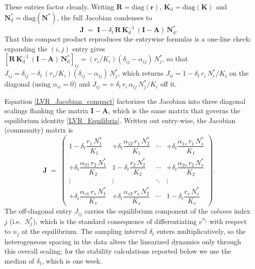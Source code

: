 \documentclass[12pt]{article}
\begin{document}
These entries factor cleanly. Writing $\mathbf{R}=\mathrm{diag}(\mathbf{r})$, $\mathbf{K}_{\mathrm{d}}=\mathrm{diag}(\mathbf{K})$ and $\mathbf{N}^{*}_{\mathrm{d}}=\mathrm{diag}(\mathbf{N}^{*})$, the full Jacobian condenses to
\begin{equation}\label{LVR_Jacobian_compact}
	\mathbf{J} \;=\; \mathbf{I} - \delta_{t}\,\mathbf{R}\,\mathbf{K}_{\mathrm{d}}^{-1}\,(\mathbf{I}-\mathbf{A})\,\mathbf{N}^{*}_{\mathrm{d}}.
\end{equation}
That this compact product reproduces the entrywise formulas is a one-line check: expanding the $(i,j)$ entry gives $[\mathbf{R}\,\mathbf{K}_{\mathrm{d}}^{-1}\,(\mathbf{I}-\mathbf{A})\,\mathbf{N}^{*}_{\mathrm{d}}]_{ij}=(r_{i}/K_{i})(\delta_{ij}-\alpha_{ij})\,N_{j}^{*}$, so that $J_{ij}=\delta_{ij}-\delta_{t}\,(r_{i}/K_{i})(\delta_{ij}-\alpha_{ij})\,N_{j}^{*}$, which returns $J_{ii}=1-\delta_{t}\,r_{i}\,N_{i}^{*}/K_{i}$ on the diagonal (using $\alpha_{ii}=0$) and $J_{ij}=+\,\delta_{t}\,r_{i}\,\alpha_{ij}\,N_{j}^{*}/K_{i}$ off it.

Equation \eqref{LVR_Jacobian_compact} factorizes the Jacobian into three diagonal scalings flanking the matrix $\mathbf{I}-\mathbf{A}$, which is the same matrix that governs the equilibrium identity \eqref{LVR_Equilibria}. Written out entry-wise, the Jacobian (community) matrix is
\begin{equation}\label{LVR_Jacobian}
	\mathbf{J} \;=\; \begin{pmatrix}
		1-\delta_{t}\dfrac{r_{1}\,N_{1}^{*}}{K_{1}} & +\delta_{t}\dfrac{\alpha_{12}\,r_{1}\,N_{2}^{*}}{K_{1}} & \cdots & +\delta_{t}\dfrac{\alpha_{1s}\,r_{1}\,N_{s}^{*}}{K_{1}} \\[6pt]
		+\delta_{t}\dfrac{\alpha_{21}\,r_{2}\,N_{1}^{*}}{K_{2}} & 1-\delta_{t}\dfrac{r_{2}\,N_{2}^{*}}{K_{2}} & \cdots & +\delta_{t}\dfrac{\alpha_{2s}\,r_{2}\,N_{s}^{*}}{K_{2}} \\[2pt]
		\vdots & \vdots & \ddots & \vdots \\[2pt]
		+\delta_{t}\dfrac{\alpha_{s1}\,r_{s}\,N_{1}^{*}}{K_{s}} & +\delta_{t}\dfrac{\alpha_{s2}\,r_{s}\,N_{2}^{*}}{K_{s}} & \cdots & 1-\delta_{t}\dfrac{r_{s}\,N_{s}^{*}}{K_{s}}
	\end{pmatrix}.
\end{equation}
The off-diagonal entry $J_{ij}$ carries the equilibrium component of the \emph{column} index $j$ (i.e.\ $N_{j}^{*}$), which is the standard consequence of differentiating $e^{n_{j}}$ with respect to $n_{j}$ at the equilibrium. The sampling interval $\delta_{t}$ enters multiplicatively, so the heterogeneous spacing in the data alters the linearized dynamics only through this overall scaling; for the stability calculations reported below we use the median of $\delta_{t}$, which is one week.
\end{document}

